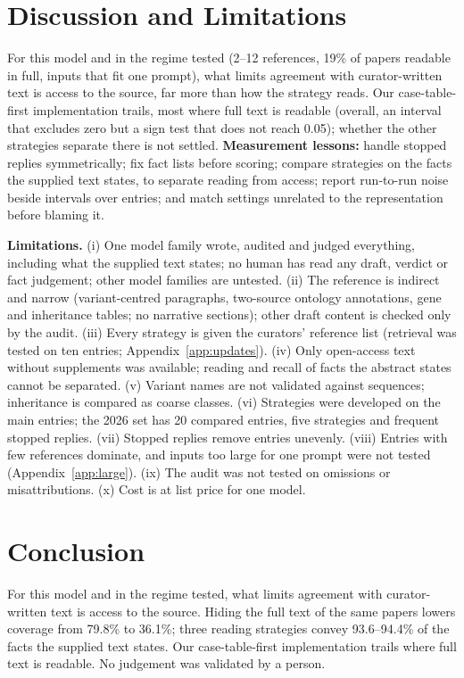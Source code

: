 \documentclass{article} %
\begin{document}
\section{Discussion and Limitations}
\label{sec:discussion}
For this model and in the regime tested (2--12 references, 19\% of papers readable in full, inputs that fit one prompt), what limits agreement with curator-written text is access to the source, far more than how the strategy reads. Our case-table-first implementation trails, most where full text is readable (overall, an interval that excludes zero but a sign test that does not reach 0.05); whether the other strategies separate there is not settled. \textbf{Measurement lessons:} handle stopped replies symmetrically; fix fact lists before scoring; compare strategies on the facts the supplied text states, to separate reading from access; report run-to-run noise beside intervals over entries; and match settings unrelated to the representation before blaming it.

\textbf{Limitations.} (i) One model family wrote, audited and judged everything, including what the supplied text states; no human has read any draft, verdict or fact judgement; other model families are untested. (ii) The reference is indirect and narrow (variant-centred paragraphs, two-source ontology annotations, gene and inheritance tables; no narrative sections); other draft content is checked only by the audit. (iii) Every strategy is given the curators' reference list (retrieval was tested on ten entries; Appendix~\ref{app:updates}). (iv) Only open-access text without supplements was available; reading and recall of facts the abstract states cannot be separated. (v) Variant names are not validated against sequences; inheritance is compared as coarse classes. (vi) Strategies were developed on the main entries; the 2026 set has 20 compared entries, five strategies and frequent stopped replies. (vii) Stopped replies remove entries unevenly. (viii) Entries with few references dominate, and inputs too large for one prompt were not tested (Appendix~\ref{app:large}). (ix) The audit was not tested on omissions or misattributions. (x) Cost is at list price for one model.

\section{Conclusion}
\label{sec:conclusion}
For this model and in the regime tested, what limits agreement with curator-written text is access to the source. Hiding the full text of the same papers lowers coverage from 79.8\% to 36.1\%; three reading strategies convey 93.6--94.4\% of the facts the supplied text states. Our case-table-first implementation trails where full text is readable. No judgement was validated by a person.
\end{document}
